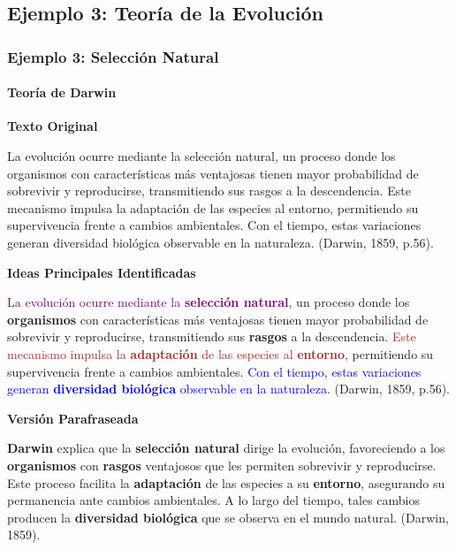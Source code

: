 \documentclass[aspectratio=169]{beamer}
\begin{document}
\subsection{Ejemplo 3: Teoría de la Evolución}

\begin{frame}[allowframebreaks]
	\frametitle{Ejemplo 3: Selección Natural}
	\framesubtitle{Teoría de Darwin}
	
	\textbf{Texto Original}
	\begin{block}{}
		\small
		La evolución ocurre mediante la selección natural, un proceso donde los organismos con características más ventajosas tienen mayor probabilidad de sobrevivir y reproducirse, transmitiendo sus rasgos a la descendencia. Este mecanismo impulsa la adaptación de las especies al entorno, permitiendo su supervivencia frente a cambios ambientales. Con el tiempo, estas variaciones generan diversidad biológica observable en la naturaleza. (Darwin, 1859, p.56).
	\end{block}
	
	\framebreak
	
	\textbf{Ideas Principales Identificadas}
	\begin{block}{}
		\small
		\textcolor{purple}{La evolución ocurre mediante la \textbf{selección natural}}, un proceso donde los \textbf{organismos} con características más ventajosas tienen mayor probabilidad de sobrevivir y reproducirse, transmitiendo sus \textbf{rasgos} a la descendencia. \textcolor{brown}{Este mecanismo impulsa la \textbf{adaptación} de las especies al \textbf{entorno}}, permitiendo su supervivencia frente a cambios ambientales. \textcolor{blue}{Con el tiempo, estas variaciones generan \textbf{diversidad biológica} observable en la naturaleza}. (Darwin, 1859, p.56).
	\end{block}
	
	\framebreak
	
	\textbf{Versión Parafraseada}
	\begin{block}{}
		\small
		\textbf{Darwin} explica que la \textbf{selección natural} dirige la evolución, favoreciendo a los \textbf{organismos} con \textbf{rasgos} ventajosos que les permiten sobrevivir y reproducirse. Este proceso facilita la \textbf{adaptación} de las especies a su \textbf{entorno}, asegurando su permanencia ante cambios ambientales. A lo largo del tiempo, tales cambios producen la \textbf{diversidad biológica} que se observa en el mundo natural. (Darwin, 1859).
	\end{block}
\end{frame}
\end{document}
